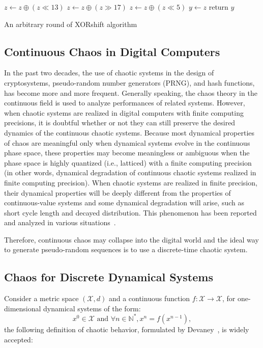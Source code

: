 \documentclass[journal]{IEEEtran}
\begin{document}
\begin{algorithm}
\SetAlgoLined
{}
$z\leftarrow{z\oplus{(z\ll13)}}$\;
$z\leftarrow{z\oplus{(z\gg17)}}$\;
$z\leftarrow{z\oplus{(z\ll5)}}$\;
$y\leftarrow{z}$\;
return $y$\;
\medskip
\caption{An arbitrary round of XORshift algorithm}
\label{XORshift}
\end{algorithm}



\subsection{Continuous Chaos in Digital Computers}

In the past two decades, the use of chaotic systems in the design of cryptosystems, pseudo-random number generators (PRNG), and hash functions, has become more and more frequent.
Generally speaking, the chaos theory in the continuous field is used to analyze performances of related systems. However, when chaotic systems are realized in digital computers with finite computing precisions, it is doubtful whether or not they can still preserve the desired dynamics of the continuous chaotic systems. Because most dynamical properties of chaos are meaningful only when dynamical systems evolve in the continuous phase space, these properties may become meaningless or ambiguous when the phase space is highly quantized (i.e., latticed) with a finite computing precision (in other words, dynamical degradation of continuous chaotic systems realized
in finite computing precision). When chaotic systems are realized in finite precision, their dynamical properties will be deeply different from the properties of continuous-value systems and some dynamical degradation will arise, such as short cycle length and decayed distribution. This phenomenon has been reported and analyzed in various situations~\cite{Binder1986,Wheeler1989,Palmore1990,Blank1997,Li2005}.


Therefore, continuous chaos may collapse into the digital world and the ideal way to generate pseudo-random sequences is to use a discrete-time chaotic system.




\subsection{Chaos for Discrete Dynamical Systems}

Consider a metric space $(\mathcal{X},d)$ and a continuous function $f:\mathcal{X}\longrightarrow \mathcal{X}$, for one-dimensional dynamical systems of the form:
\begin{equation}
x^0 \in \mathcal{X} \textrm{  and } \forall n \in \mathds{N}^*, x^n=f(x^{n-1}),
\label{Devaney}
\end{equation}
the following definition of chaotic behavior, formulated by Devaney~\cite{Dev89}, is widely accepted:
\end{document}
